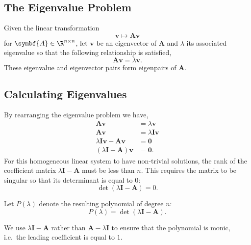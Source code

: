 \documentclass{article}
\begin{document}
\subsection{The Eigenvalue Problem}
Given the linear transformation
\begin{equation*}
    \symbf{v} \mapsto \symbf{A} \symbf{v}
\end{equation*}
for \(\symbf{A}\in\R^{n \times n}\), let \(\symbf{v}\) be an eigenvector of \(\symbf{A}\)
and \(\lambda\) its associated eigenvalue so that the following relationship is
satisfied,
\begin{equation*}
    \symbf{A}\symbf{v} = \lambda \symbf{v}.
\end{equation*}
These eigenvalue and eigenvector pairs form eigenpairs of \(\symbf{A}\).
\subsection{Calculating Eigenvalues}
By rearranging the eigenvalue problem we have,
\begin{align*}
    \symbf{A}\symbf{v}                                    & = \lambda \symbf{v}           \\
    \symbf{A}\symbf{v}                                    & = \lambda \symbf{I} \symbf{v} \\
    \lambda \symbf{I} \symbf{v} - \symbf{A}\symbf{v}      & = \symbf{0}                   \\
    \left( \lambda \symbf{I} - \symbf{A} \right)\symbf{v} & = \symbf{0}.
\end{align*}
For this homogeneous linear system to have non-trivial solutions, the rank of the coefficient matrix \(\lambda \symbf{I} - \symbf{A}\)
must be less than \(n\). This requires the matrix to be singular so that its determinant is equal to \(0\):
\begin{equation*}
    \det{\left( \lambda \symbf{I} - \symbf{A} \right)} = 0.
\end{equation*}
\begin{definition}
    Let \(P\left( \lambda \right)\) denote the resulting polynomial of degree \(n\):
    \begin{equation*}
        P\left( \lambda \right) = \det{\left( \lambda \symbf{I} - \symbf{A} \right)}.
    \end{equation*}
\end{definition}
We use \(\lambda \symbf{I} - \symbf{A}\) rather than \(\symbf{A} - \lambda \symbf{I}\) to ensure that the polynomial is monic,
i.e.\ the leading coefficient is equal to \(1\).
\end{document}
